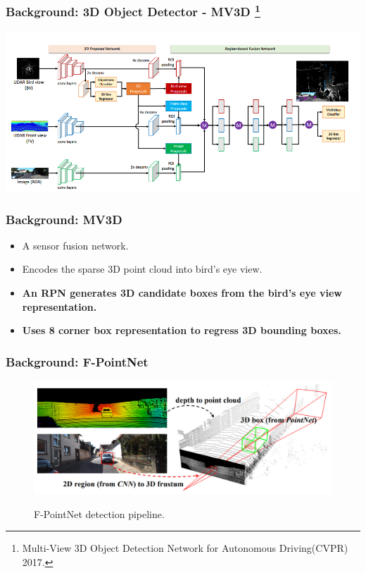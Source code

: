 \documentclass[10pt,fleqn,unknownkeysallowed]{beamer}
\begin{document}
\begin{frame}
	\frametitle{Background: 3D Object Detector - MV3D \footnote{\tiny{ Multi-View 3D Object Detection Network for Autonomous Driving(CVPR) 2017.}}}
	\begin{center}
		\includegraphics[width=1.0\textwidth]{images/mv3d_arch}
	\end{center}
	
\end{frame}

\begin{frame}
	\frametitle{Background: MV3D}
	\linespread{1.5}
	\begin{itemize}
		\item{A sensor fusion network.}
		\item{Encodes the sparse 3D point cloud into bird's eye view.}
		\item{\textbf{An RPN generates 3D candidate boxes from the bird's eye view representation.}}
		\item{\textbf{Uses 8 corner box representation to regress 3D bounding boxes.}}
	\end{itemize}
\end{frame}

\begin{frame}
	\frametitle{Background: F-PointNet}
	\begin{figure}
		\begin{center}
			\includegraphics[width=1.0\linewidth]{images/fpoint_net} \\
			\caption{F-PointNet detection pipeline.}
		\end{center}
	\end{figure}
\end{frame}
\end{document}
